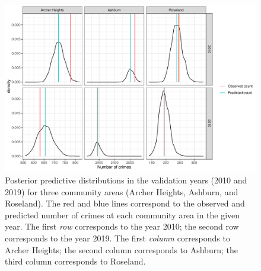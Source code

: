 \documentclass[12pt,a4paper]{article}
\begin{document}
\begin{figure}[t!]
    \centering
    \includegraphics[width = \linewidth]{Images/chicago_predictive_distributions.pdf}
    \caption{Posterior predictive distributions in the validation years (2010 and 2019) for three community areas (Archer Heights, Ashburn, and Roseland). The red and blue lines correspond to the observed and predicted number of crimes at each community area in the given year. 
    The first \textit{row} corresponds to the year 2010; the second row corresponds to the year 2019. The first \textit{column} corresponds to Archer Heights; the second column corresponds to Ashburn; the third column corresponds to Roseland. 
}   
  \label{fig:chicago_predictive_distributions}
\end{figure}
\end{document}
